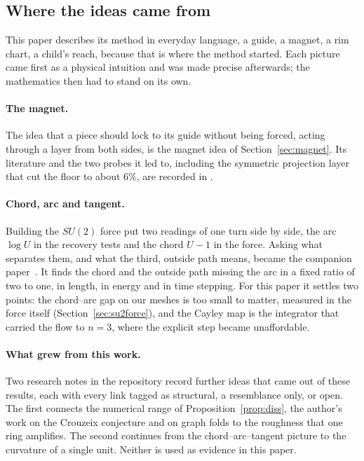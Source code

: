 \documentclass[11pt]{article}
\theoremstyle{definition}
\theoremstyle{remark}
\begin{document}
\subsection{Where the ideas came from}\label{sec:provenance}

This paper describes its method in everyday language, a guide, a magnet, a rim chart, a
child's reach, because that is where the method started. Each picture came first as a
physical intuition and was made precise afterwards; the mathematics then had to stand on
its own.

\paragraph{The magnet.} The idea that a piece should lock to its guide without being forced,
acting through a layer from both sides, is the magnet idea of Section~\ref{sec:magnet}. Its
literature and the two probes it led to, including the symmetric projection layer that cut
the floor to about $6\%$, are recorded in .

\paragraph{Chord, arc and tangent.} Building the $SU(2)$ force put two readings of one turn
side by side, the arc $\log U$ in the recovery tests and the chord $U-1$ in the force. Asking what
separates them, and what the third, outside path means, became the companion
paper~\cite{threeways}. It finds the chord and the outside path missing the arc in a fixed
ratio of two to one, in length, in energy and in time stepping. For this paper it settles
two points: the chord--arc gap on our meshes is too small to matter, measured in the force
itself (Section~\ref{sec:su2force}), and the Cayley map is the integrator that carried the flow to
$n=3$, where the explicit step became unaffordable.

\paragraph{What grew from this work.} Two research notes in the repository record further ideas that
came out of these results, each with every link tagged as structural, a resemblance only, or open.
The first connects the numerical range of Proposition~\ref{prop:diss}, the author's work on the
Crouzeix conjecture and on graph folds to the roughness that one ring amplifies. The second continues
from the chord--arc--tangent picture to the curvature of a single unit. Neither is used as evidence in
this paper.
\end{document}
